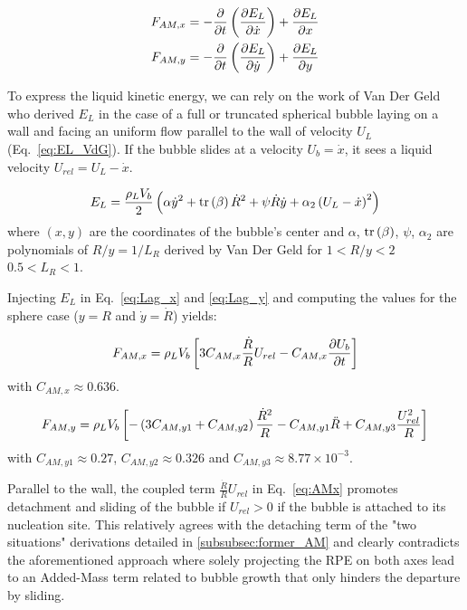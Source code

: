 \begin{align}
\label{eq:Lag_x}
F_{AM,x}&=-\frac{\partial }{\partial t}\left( \frac{\partial E_{L}}{\partial \dot{x}} \right)+\frac{\partial E_{L}}{\partial x}\\
\label{eq:Lag_y}
F_{AM,y}&=-\frac{\partial }{\partial t}\left( \frac{\partial E_{L}}{\partial \dot{y}} \right)+\frac{\partial E_{L}}{\partial y}
\end{align}


To express the liquid kinetic energy, we can rely on the work of Van Der Geld \cite{van_der_geld_dynamics_2009} who derived $E_{L}$ in the case of a full or truncated spherical bubble laying on a wall and facing an uniform flow parallel to the wall of velocity $U_{L}$ (Eq.~\ref{eq:EL_VdG}). If the bubble slides at a velocity $U_{b}=\dot{x}$, it sees a liquid velocity $U_{rel}=U_{L}-\dot{x}$.

\begin{align}
E_{L}=\frac{\rho_{L}V_{b}}{2}\left( \alpha \dot{y}^{2} +\mathrm{tr}\left( \beta \right)\dot{R}^{2}+\psi \dot{R}\dot{y} +\alpha_{2} \left( U_{L}-\dot{x} \right)^{2}  \right)
\label{eq:EL_VdG}
\end{align}
where $(x,y)$ are the coordinates of the bubble's center and $\alpha$, $\mathrm{tr}\left( \beta \right)$, $\psi$, $\alpha_{2}$ are polynomials of $R/y = 1/L_{R}$ derived by Van Der Geld for $1<R/y<2$ \ie $0.5<L_{R}<1$.



Injecting $E_{L}$ in Eq.~\ref{eq:Lag_x} and \ref{eq:Lag_y} and computing the values for the sphere case ($y=R$ and $\dot{y} = \dot{R}$) yields:

\begin{align}
F_{AM,x}=\rho_{L}V_{b}\left[ 3C_{AM,x}\frac{\dot{R}}{R}U_{rel} - C_{AM,x}\frac{\partial{U_{b}}}{\partial t} \right]
\label{eq:AMx}
\end{align}
with $C_{AM,x} \approx 0.636$.


\begin{align}
F_{AM,y}=\rho_{L}V_{b}\left[ -\left( 3 C_{AM,y1} + C_{AM,y2} \right)\frac{\dot{R}^{2}}{R}-C_{AM,y1}\ddot{R} + C_{AM,y3}\frac{U_{rel}^{2}}{R} \right]
\label{eq:AMy}
\end{align}
with $C_{AM,y1} \approx 0.27$, $C_{AM,y2}\approx 0.326$ and $C_{AM,y3}\approx 8.77\times  10^{-3}$.


\npar
 
 


Parallel to the wall, the coupled term $\frac{\dot{R}}{R}U_{rel}$ in Eq.~\ref{eq:AMx} promotes detachment and sliding of the bubble if $U_{rel}>0$ \eg if the bubble is attached to its nucleation site. This relatively agrees with the detaching term of the "two situations" derivations detailed in \ref{subsubsec:former_AM} and clearly contradicts the aforementioned approach where solely projecting the RPE on both axes lead to an Added-Mass term related to bubble growth that only hinders the departure by sliding. 

